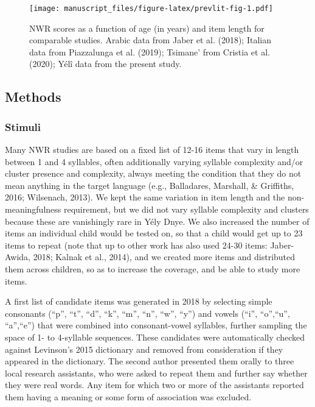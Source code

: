 \documentclass[english,,man,floatsintext]{apa6}
\begin{document}
\begin{figure}
\centering
\texttt{[image: manuscript\_files/figure-latex/prevlit-fig-1.pdf]}
\caption{\label{fig:prevlit-fig}NWR scores as a function of age (in years) and item length for comparable studies. Arabic data from Jaber et al. (2018); Italian data from Piazzalunga et al. (2019); Tsimane' from Cristia et al. (2020); Yélî data from the present study.}
\end{figure}

\hypertarget{methods}{%
\subsection{Methods}\label{methods}}

\hypertarget{stimuli}{%
\subsubsection{Stimuli}\label{stimuli}}

Many NWR studies are based on a fixed list of 12-16 items that vary in length between 1 and 4 syllables, often additionally varying syllable complexity and/or cluster presence and complexity, always meeting the condition that they do not mean anything in the target language (e.g., Balladares, Marshall, \& Griffiths, 2016; Wilsenach, 2013). We kept the same variation in item length and the non-meaningfulness requirement, but we did not vary syllable complexity and clusters because these are vanishingly rare in Yély Dnye. We also increased the number of items an individual child would be tested on, so that a child would get up to 23 items to repeat (note that up to other work has also used 24-30 items: Jaber-Awida, 2018; Kalnak et al., 2014), and we created more items and distributed them across children, so as to increase the coverage, and be able to study more items.

A first list of candidate items was generated in 2018 by selecting simple consonants (``p'', ``t'', ``d'', ``k'', ``m'', ``n'', ``w'', ``y'') and vowels (``i'', ``o'',``u'', ``a'',``e'') that were combined into consonant-vowel syllables, further sampling the space of 1- to 4-syllable sequences. These candidates were automatically checked against Levinson's 2015 dictionary and removed from consideration if they appeared in the dictionary. The second author presented them orally to three local research assistants, who were asked to repeat them and further say whether they were real words. Any item for which two or more of the assistants reported them having a meaning or some form of association was excluded.
\end{document}
